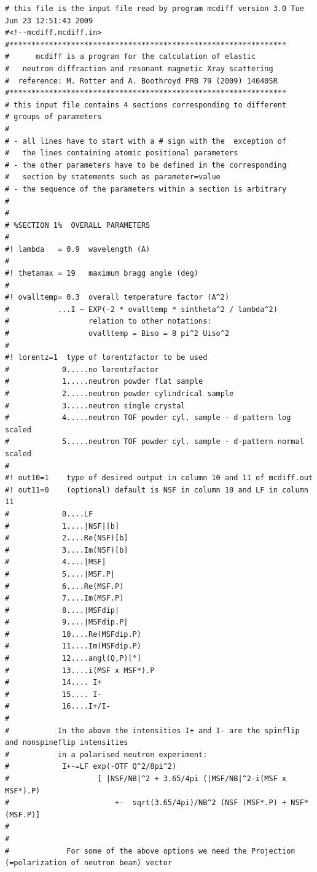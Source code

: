 {\footnotesize
\begin{verbatim}
# this file is the input file read by program mcdiff version 3.0 Tue Jun 23 12:51:43 2009
#<!--mcdiff.mcdiff.in>
#***************************************************************
#      mcdiff is a program for the calculation of elastic
#   neutron diffraction and resonant magnetic Xray scattering 
#  reference: M. Rotter and A. Boothroyd PRB 79 (2009) 140405R
#*************************************************************** 
# this input file contains 4 sections corresponding to different
# groups of parameters
#
# - all lines have to start with a # sign with the  exception of 
#   the lines containing atomic positional parameters
# - the other parameters have to be defined in the corresponding 
#   section by statements such as parameter=value
# - the sequence of the parameters within a section is arbitrary
# 
#
# %SECTION 1%  OVERALL PARAMETERS
#
#! lambda   = 0.9  wavelength (A)
#
#! thetamax = 19   maximum bragg angle (deg)
#
#! ovalltemp= 0.3  overall temperature factor (A^2) 
#           ...I ~ EXP(-2 * ovalltemp * sintheta^2 / lambda^2) 
#                  relation to other notations:
#                  ovalltemp = Biso = 8 pi^2 Uiso^2
#
#! lorentz=1  type of lorentzfactor to be used
#            0.....no lorentzfactor 
#            1.....neutron powder flat sample
#            2.....neutron powder cylindrical sample
#            3.....neutron single crystal
#            4.....neutron TOF powder cyl. sample - d-pattern log scaled
#            5.....neutron TOF powder cyl. sample - d-pattern normal scaled
#
#! out10=1    type of desired output in column 10 and 11 of mcdiff.out
#! out11=0    (optional) default is NSF in column 10 and LF in column 11
#            0....LF
#            1....|NSF|[b]
#            2....Re(NSF)[b]
#            3....Im(NSF)[b]
#            4....|MSF|
#            5....|MSF.P|
#            6....Re(MSF.P)
#            7....Im(MSF.P)
#            8....|MSFdip|
#            9....|MSFdip.P|
#            10....Re(MSFdip.P)
#            11....Im(MSFdip.P)
#            12....angl(Q,P)[°]
#            13....i(MSF x MSF*).P
#            14.... I+
#            15.... I-
#            16....I+/I-
#
#           In the above the intensities I+ and I- are the spinflip and nonspineflip intensities
#           in a polarised neutron experiment:
#            I+-=LF exp(-OTF Q^2/8pi^2) 
#                    [ |NSF/NB|^2 + 3.65/4pi (|MSF/NB|^2-i(MSF x MSF*).P) 
#                        +-  sqrt(3.65/4pi)/NB^2 (NSF (MSF*.P) + NSF* (MSF.P)]
#
#
#             For some of the above options we need the Projection (=polarization of neutron beam) vector

\end{verbatim}}

